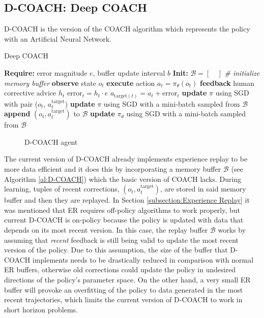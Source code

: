 \subsection{D-COACH: Deep COACH}
\label{subsection:D-COACH}


D-COACH \cite{ResearchAssignmentpaper} is the  version of the COACH algorithm which represents the policy with an Artificial Neural Network.

\begin{algorithm}[H]
\caption{Deep COACH}\label{algorithm:DeepCOACH}
\begin{algorithmic}[1]
\State \textbf{Require:} error magnitude $e$, buffer update interval $b$
\State \textbf{Init:} $\mathcal{B} = [\quad]$  \emph{\# initialize memory buffer}
\State \textbf{observe} state $o_{t}$
\State \textbf{execute} action $a_{t}=\pi_{\theta}(o_{t})$
\State \textbf{feedback} human corrective advice $h_{t}$
\State $\text{error}_{t} = h_{t}\cdot e$
\State $a_{\text{target}(t)} = a_{t} + \text{error}_{t}$
\State \textbf{update} $\pi$ using SGD with pair ($o_{t}$, $a^{\text{target}}_{t}$)
\State \textbf{update} $\pi$ using SGD with a mini-batch sampled from $\mathcal{B}$
\State \textbf{append} $(o_{t}, a^{\text{target}}_{t})$ to $\mathcal{B}$
\EndIf
{}
\State \textbf{update} $\pi_{\theta}$ using SGD with a mini-batch sampled from $\mathcal{B}$
\EndIf
\EndFor
\end{algorithmic}
\label{al:D-COACH}
\end{algorithm}

\begin{figure}[H]
    \centering
    \caption{D-COACH agent}
    \label{fig:DCOACH_diagram}
\end{figure}

The current version of D-COACH already implements experience replay to be more data efficient and it does this by incorporating a memory buffer $\mathcal{B}$ (see Algorithm \ref{al:D-COACH}) which the basic version of COACH lacks. During learning, tuples of recent corrections, $(o_t, a^{\text{target}}_t)$, are stored in said memory buffer and then they are replayed. In Section \ref{subsection:Experience Replay} it was mentioned that ER requires off-policy algorithms to work properly, but current D-COACH is on-policy because the policy is updated with data that depends on its most recent version. In this case, the replay buffer $\mathcal{B}$ works by assuming that \textit{recent} feedback is still being valid to update the most recent version of the policy. Due to this assumption, the size of the buffer that D-COACH implements needs to be drastically reduced in comparison with normal ER buffers, otherwise old corrections could update the policy in undesired directions of the policy’s parameter space. On the other hand, a very small ER buffer will provoke an  overfitting of the policy to data generated in the most recent trajectories, which limits the current version of D-COACH to work in short horizon problems.


